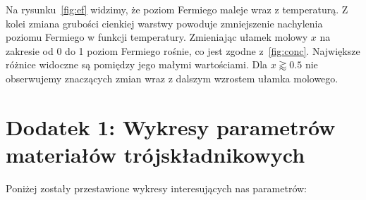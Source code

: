 \documentclass[12pt,openany,a4paper]{book}
\begin{document}
Na rysunku~\ref{fig:ef} widzimy, że poziom Fermiego maleje wraz z temperaturą. Z kolei
zmiana grubości cienkiej warstwy powoduje zmniejszenie nachylenia poziomu Fermiego w funkcji
temperatury. Zmieniając ułamek molowy \(x\) na zakresie od 0 do 1 poziom Fermiego
rośnie, co jest zgodne z~\ref{fig:conc}. Największe różnice
widoczne są pomiędzy jego małymi wartościami. Dla \(x\gtrapprox 0.5\) nie obserwujemy znaczących
zmian wraz z dalszym wzrostem ułamka molowego.



\chapter*{Dodatek 1: Wykresy parametrów materiałów trójskładnikowych}\label{chapt:dodatek}
Poniżej zostały przestawione wykresy interesujących nas parametrów:
\end{document}
